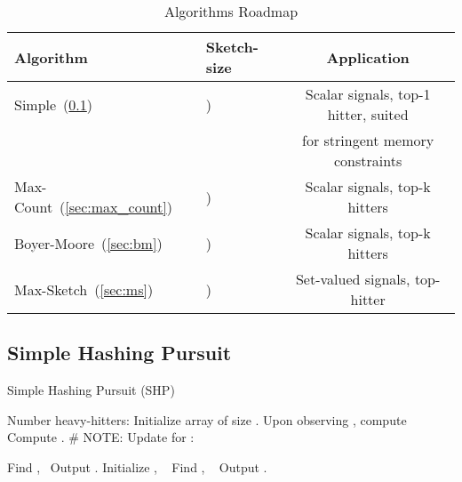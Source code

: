 \documentclass[10pt, conference, letterpaper,onecolumn]{IEEEtranv1.8}
\theoremstyle{plain}\newtheorem{thm}{Theorem}\newtheorem{lem}{Lemma}
\theoremstyle{definition}
\begin{document}
\begin{table}[t]
\caption{Algorithms Roadmap}
\scriptsize
\centering
\label{tab:roadmap}
\begin{tabular}{|l|l|c|}
\hline
{\bf Algorithm}                & {\bf Sketch-size}             & {\bf Application}  \\   
\hline\hline                                                              
Simple~(\ref{sec:simple})                   & )          & Scalar signals, top-1 hitter, suited  \\
                    &           &                            for stringent memory constraints  \\
\hline                    
Max-Count~(\ref{sec:max_count})                & ) & Scalar signals, top-k hitters                                                \\
\hline
Boyer-Moore~(\ref{sec:bm}) & )          & Scalar signals, top-k hitters                                                \\
\hline
Max-Sketch~(\ref{sec:ms})               & ) & Set-valued signals, top-hitter         \\
\hline                                     
\end{tabular}
\end{table}


\subsection{Simple Hashing Pursuit}
\label{sec:simple}








\setcounter{algorithm}{0}
\begin{algorithm}[t]
\caption{Simple Hashing Pursuit (SHP)}
\label{alg:shp}
\begin{algorithmic}[1]
\REQUIRE Number heavy-hitters: 
\STATE [Start]   Initialize array  of size .
\STATE [Permute]  Upon observing , compute 
\STATE [Hash]  Compute .  \# NOTE:  
\STATE [Update]    Update   for :
   
 \vspace{-10pt}  
 \STATE Find , \  
 \STATE [decode] Output . 
 \ELSE
  \STATE Initialize , \  
        \STATE Find , \  
         \STATE [decode] Output . 
   \ENDFOR
 \ENDIF    
 \ENDIF    
\end{algorithmic}
\end{algorithm} 
\end{document}
